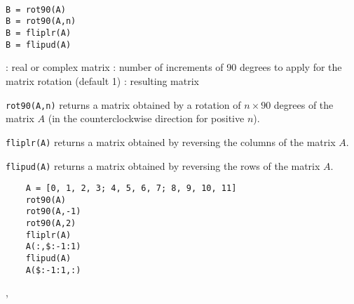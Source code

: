 
\begin{mandesc}
  \\
  \\
  \\
\end{mandesc}

\begin{calling_sequence}
\begin{verbatim}
B = rot90(A)
B = rot90(A,n)
B = fliplr(A)
B = flipud(A)
\end{verbatim}
\end{calling_sequence}
\begin{parameters}
  \begin{varlist}
    : real or complex matrix
    : number of increments of 90 degrees to apply for the matrix rotation (default 1)
    : resulting matrix
  \end{varlist}
\end{parameters}

\begin{mandescription}

\verb+rot90(A,n)+ returns a matrix obtained by a rotation of $n \times 90$ degrees of the
matrix $A$ (in the counterclockwise direction for positive $n$).

\verb+fliplr(A)+ returns a matrix obtained by reversing the columns of the matrix $A$.

\verb+flipud(A)+ returns a matrix obtained by reversing the rows of the matrix $A$.

\end{mandescription}
 
\begin{examples}
  \begin{Verbatim}
    A = [0, 1, 2, 3; 4, 5, 6, 7; 8, 9, 10, 11]
    rot90(A)
    rot90(A,-1)
    rot90(A,2)
    fliplr(A) 
    A(:,$:-1:1)
    flipud(A) 
    A($:-1:1,:)
  \end{Verbatim}
\end{examples}


\begin{manseealso}
  , 
\end{manseealso}

